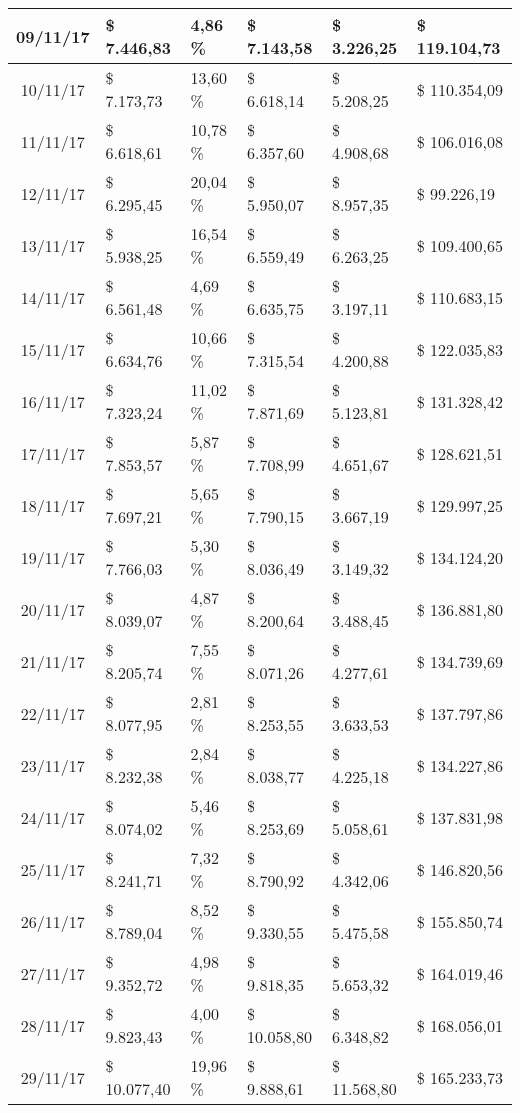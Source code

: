 \begin{small}
\begin{longtable}{|c|l|l|l|l|l|}
09/11/17 & \$ 7.446,83 & 4,86 \% & \$ 7.143,58 & \$ 3.226,25 & \$ 119.104,73 \\ \hline
10/11/17 & \$ 7.173,73 & 13,60 \% & \$ 6.618,14 & \$ 5.208,25 & \$ 110.354,09 \\ \hline
11/11/17 & \$ 6.618,61 & 10,78 \% & \$ 6.357,60 & \$ 4.908,68 & \$ 106.016,08 \\ \hline
12/11/17 & \$ 6.295,45 & 20,04 \% & \$ 5.950,07 & \$ 8.957,35 & \$ 99.226,19 \\ \hline
13/11/17 & \$ 5.938,25 & 16,54 \% & \$ 6.559,49 & \$ 6.263,25 & \$ 109.400,65 \\ \hline
14/11/17 & \$ 6.561,48 & 4,69 \% & \$ 6.635,75 & \$ 3.197,11 & \$ 110.683,15 \\ \hline
15/11/17 & \$ 6.634,76 & 10,66 \% & \$ 7.315,54 & \$ 4.200,88 & \$ 122.035,83 \\ \hline
16/11/17 & \$ 7.323,24 & 11,02 \% & \$ 7.871,69 & \$ 5.123,81 & \$ 131.328,42 \\ \hline
17/11/17 & \$ 7.853,57 & 5,87 \% & \$ 7.708,99 & \$ 4.651,67 & \$ 128.621,51 \\ \hline
18/11/17 & \$ 7.697,21 & 5,65 \% & \$ 7.790,15 & \$ 3.667,19 & \$ 129.997,25 \\ \hline
19/11/17 & \$ 7.766,03 & 5,30 \% & \$ 8.036,49 & \$ 3.149,32 & \$ 134.124,20 \\ \hline
20/11/17 & \$ 8.039,07 & 4,87 \% & \$ 8.200,64 & \$ 3.488,45 & \$ 136.881,80 \\ \hline
21/11/17 & \$ 8.205,74 & 7,55 \% & \$ 8.071,26 & \$ 4.277,61 & \$ 134.739,69 \\ \hline
22/11/17 & \$ 8.077,95 & 2,81 \% & \$ 8.253,55 & \$ 3.633,53 & \$ 137.797,86 \\ \hline
23/11/17 & \$ 8.232,38 & 2,84 \% & \$ 8.038,77 & \$ 4.225,18 & \$ 134.227,86 \\ \hline
24/11/17 & \$ 8.074,02 & 5,46 \% & \$ 8.253,69 & \$ 5.058,61 & \$ 137.831,98 \\ \hline
25/11/17 & \$ 8.241,71 & 7,32 \% & \$ 8.790,92 & \$ 4.342,06 & \$ 146.820,56 \\ \hline
26/11/17 & \$ 8.789,04 & 8,52 \% & \$ 9.330,55 & \$ 5.475,58 & \$ 155.850,74 \\ \hline
27/11/17 & \$ 9.352,72 & 4,98 \% & \$ 9.818,35 & \$ 5.653,32 & \$ 164.019,46 \\ \hline
28/11/17 & \$ 9.823,43 & 4,00 \% & \$ 10.058,80 & \$ 6.348,82 & \$ 168.056,01 \\ \hline
29/11/17 & \$ 10.077,40 & 19,96 \% & \$ 9.888,61 & \$ 11.568,80 & \$ 165.233,73 \\ \hline

\end{longtable}
\end{small}
